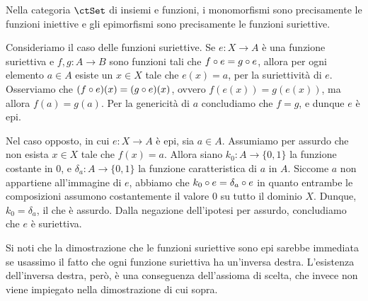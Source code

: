 \begin{example}\label{monoepi_in_set}
	Nella categoria \(\ctSet\) di insiemi e funzioni, i monomorfismi sono precisamente le funzioni iniettive	e gli epimorfismi sono precisamente le funzioni suriettive.

	Consideriamo il caso delle funzioni suriettive.	Se \(e \colon X \to A\) è una funzione suriettiva e \(f, g \colon A \to B\) sono funzioni tali che \(f \circ e = g \circ e\),	allora per ogni elemento \(a \in A\) esiste un \(x \in X\) tale che \(e(x) = a\), per la suriettività di \(e\).	Osserviamo che \((f \circ e)(x) = (g \circ e)(x)\), ovvero \(f(e(x)) = g(e(x))\),	ma allora \(f(a) = g(a)\).	Per la genericità di \(a\) concludiamo che \(f = g\), e dunque \(e\) è epi.

	Nel caso opposto, in cui \(e \colon X \to A\) è epi, sia \(a \in A\).
	Assumiamo per assurdo che non esista \(x \in X\) tale che \(f(x) = a\).
	Allora siano \(k_0 \colon A \to \{0, 1\}\) la funzione costante in \(0\),
	e \(\delta_a \colon A \to \{0, 1\}\) la funzione caratteristica di \(a\) in \(A\).
	Siccome \(a\) non appartiene all'immagine di \(e\), abbiamo che \(k_0 \circ e = \delta_a \circ e\)
	in quanto entrambe le composizioni assumono costantemente il valore \(0\) su tutto il dominio \(X\).
	Dunque, \(k_0 = \delta_a\), il che è assurdo.
	Dalla negazione dell'ipotesi per assurdo, concludiamo che \(e\) è suriettiva.
\end{example}

Si noti che la dimostrazione che le funzioni suriettive sono epi sarebbe immediata
se usassimo il fatto che ogni funzione suriettiva ha un'inversa destra.
L'esistenza dell'inversa destra, però, è una conseguenza dell'assioma di scelta,
che invece non viene impiegato nella dimostrazione di cui sopra.

